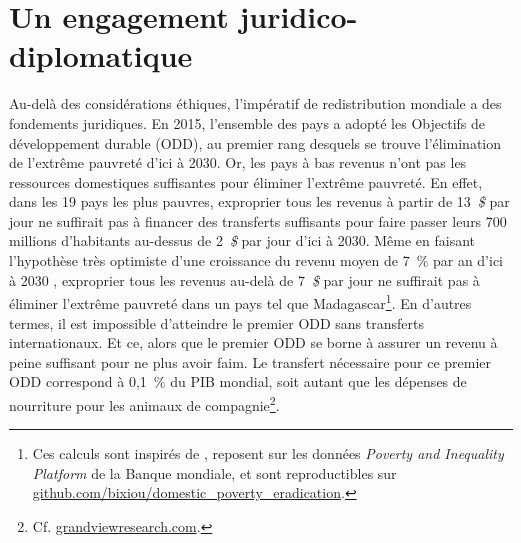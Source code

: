 \documentclass[a5paper,french,openany]{memoir}
\begin{document}
\section{Un engagement juridico-diplomatique}
Au-delà des considérations éthiques, l'impératif de redistribution mondiale a des fondements juridiques. En 2015, l'ensemble des pays a adopté les Objectifs de développement durable (ODD), au premier rang desquels se trouve l'élimination de l'extrême pauvreté d'ici à 2030. Or, les pays à bas revenus n'ont pas les ressources domestiques suffisantes pour éliminer l'extrême pauvreté. En effet,  dans les 19 pays les plus pauvres, exproprier tous les revenus à partir de 13~\textit{\$} par jour ne suffirait pas à financer des transferts suffisants pour faire passer leurs 700 millions d'habitants au-dessus de 2~\textit{\$} par jour d'ici à 2030. Même en faisant l'hypothèse très optimiste d'une croissance du revenu moyen de 7~\% par an d'ici à 2030%
, exproprier tous les revenus au-delà de 7~\textit{\$} par jour ne suffirait pas à éliminer l'extrême pauvreté dans un pays tel que Madagascar\footnote{Ces calculs sont inspirés de \citet{bolch_arithmetics_2022}, reposent sur les données \textit{Poverty and Inequality Platform} de la Banque mondiale, et sont reproductibles sur \href{https://github.com/bixiou/domestic\_poverty\_eradication/code\_poverty/main.R}{github.com/bixiou/domestic\_poverty\_eradication}.}. En d'autres termes, il est impossible d'atteindre le premier ODD sans transferts internationaux. Et ce, alors que le premier ODD se borne à assurer un revenu à peine suffisant pour ne plus avoir faim. Le transfert nécessaire pour ce premier ODD correspond à 0,1~\% du PIB mondial, soit autant que les dépenses de nourriture pour les animaux de compagnie\footnote{Cf. \href{https://www.grandviewresearch.com/industry-analysis/pet-food-industry}{grandviewresearch.com}.}. %
\end{document}
